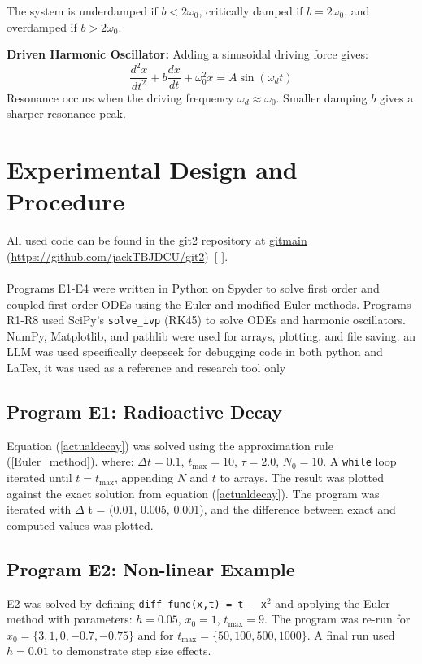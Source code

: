 \documentclass[12pt,a4paper]{article}
\newcounter{refpoint}
\newcommand{\refpoint}[1]{%
	\refstepcounter{refpoint}%
	\therefpoint%
	\label{#1}%
}
\begin{document}
	The system is underdamped if \(b < 2\omega_0\), critically damped if \(b = 2\omega_0\), and overdamped if \(b > 2\omega_0\).
	
	\textbf{Driven Harmonic Oscillator:} Adding a sinusoidal driving force gives:
	\begin{equation}
		\frac{d^2x}{dt^2} + b\frac{dx}{dt} + \omega_0^2 x = A\sin(\omega_d t)
		\label{driven}
	\end{equation}
	Resonance occurs when the driving frequency \(\omega_d \approx \omega_0\).
	Smaller damping \(b\) gives a sharper resonance peak.
	\clearpage
	\section{Experimental Design and Procedure}
	All used code can be found in the git2 repository at
	\href{https://github.com/jackTBJDCU/git2}{gitmain}
	(\url{https://github.com/jackTBJDCU/git2})~[\refpoint{git-main}].
	\paragraph{}
	Programs E1-E4 were written in Python on Spyder to solve first order and coupled first order ODEs using the Euler and modified Euler methods.
	Programs R1-R8 used SciPy's \texttt{solve\_ivp} (RK45) to solve ODEs and harmonic oscillators. NumPy, Matplotlib, and pathlib were used for arrays, plotting, and file saving.
	an LLM was used specifically deepseek for debugging code in both python and LaTex, it was used as a reference and research tool only
	
	\subsection*{Program E1: Radioactive Decay}
	Equation (\ref{actualdecay}) was solved using the approximation rule (\ref{Euler_method}). where: \(\Delta t = 0.1\), \(t_{\text{max}} = 10\), \(\tau = 2.0\), \(N_0 = 10\). A \texttt{while} loop iterated until \(t = t_{\text{max}}\), appending \(N\) and \(t\) to arrays. The result was plotted against the exact solution from equation (\ref{actualdecay}). The program was iterated with $\Delta$ t = (0.01, 0.005, 0.001), and the difference between exact and computed values was plotted.
	
	\subsection*{Program E2: Non-linear Example}
	E2 was solved by defining \texttt{diff\_func(x,t) = t - x\(^2\)} and applying the Euler method with parameters: \(h = 0.05\), \(x_0 = 1\), \(t_{\text{max}} = 9\).
	The program was re-run for \(x_0 = \{3, 1, 0, -0.7, -0.75\}\) and for \(t_{\text{max}} = \{50, 100, 500, 1000\}\). A final run used \(h = 0.01\) to demonstrate step size effects.
	
\end{document}
